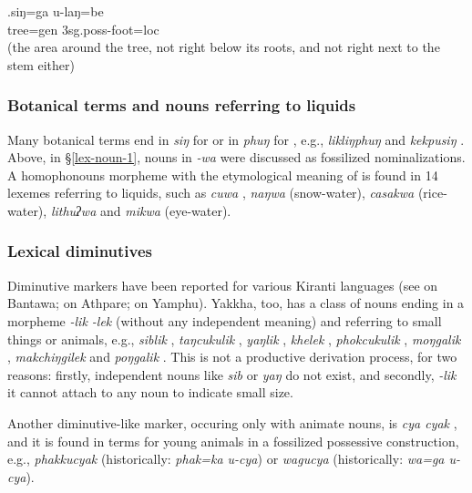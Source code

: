 \exg.siŋ=ga u-laŋ=be\\
tree{\sc =gen} {\sc 3sg.poss-}foot{\sc =loc}\\
 (the area around the tree, not right below its roots, and not right next to the stem either)


\subsubsection{Botanical terms and nouns referring to liquids}

Many botanical terms end in \emph{siŋ} for  or in \emph{phuŋ} for , e.g., \emph{likliŋphuŋ}  and \emph{kekpusiŋ} . Above, in §\ref{lex-noun-1}, nouns in \emph{-wa} were discussed as fossilized nominalizations. A homophonouns morpheme with the etymological meaning of  is found in 14 lexemes referring to liquids, such as  \emph{cuwa} , \emph{naŋwa}  (snow-water), \emph{casakwa}  (rice-water), \emph{lithuʔwa}  and \emph{mikwa}  (eye-water). 


\subsubsection{Lexical diminutives}

Diminutive markers have been reported for various Kiranti languages (see \citet[67]{Doornenbal2009A-grammar} on Bantawa; \citet[95]{Ebert1997A-grammar} on Athpare; \citet[85]{Rutgers1998Yamphu} on Yamphu). Yakkha, too, has a class of nouns ending in a morpheme \emph{-lik \ti -lek} (without any independent meaning) and referring to small things or animals, e.g., \emph{siblik} , \emph{taŋcukulik} , \emph{yaŋlik} , \emph{khelek} , \emph{phokcukulik} , \emph{moŋgalik} , \emph{makchiŋgilek}  and \emph{poŋgalik} . This is not a productive derivation process, for two reasons: firstly, independent nouns like \emph{sib} or \emph{yaŋ} do not exist, and secondly, \emph{-lik} it cannot attach to any noun to indicate small size.

Another diminutive-like marker, occuring only with animate nouns, is \emph{cya \ti cyak} , and it is found in terms for young animals in a fossilized possessive construction, e.g., \emph{phakkucyak}   (historically: \emph{phak=ka u-cya}) or \emph{wagucya}  (historically: \emph{wa=ga u-cya}).

